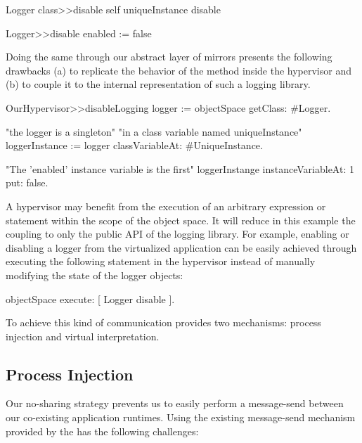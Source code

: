 \begin{code}
Logger class>>disable
	self uniqueInstance disable
	
Logger>>disable
	enabled := false
\end{code}

Doing the same through our abstract layer of mirrors presents the following drawbacks (a) to replicate the behavior of the  method inside the hypervisor and (b) to couple it to the internal representation of such a logging library. 

\begin{code}
OurHypervisor>>disableLogging
	logger := objectSpace getClass: #Logger.

	"the logger is a singleton"
	"in a class variable named uniqueInstance"
	loggerInstance := logger classVariableAt: #UniqueInstance.

	"The 'enabled' instance variable is the first"
	loggerInstange instanceVariableAt: 1 put: false.
\end{code}

A hypervisor may benefit from the execution of an arbitrary expression or statement within the scope of the object space. It will reduce in this example the coupling to only the public API of the logging library. For example, enabling or disabling a logger from the virtualized application can be easily achieved through executing the following statement in the hypervisor instead of manually modifying the state of the logger objects:

\begin{code}
objectSpace execute: [ Logger disable ].
\end{code}

To achieve this kind of communication \Vtt provides two mechanisms: process injection and virtual interpretation.

\subsection{Process Injection}
Our no-sharing strategy prevents us to easily perform a message-send between our co-existing application runtimes. Using the existing message-send mechanism provided by the \VM has the following challenges:

